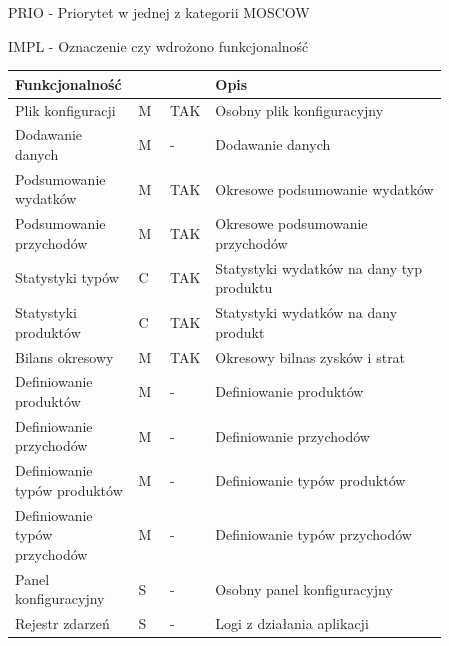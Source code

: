 \documentclass[a4paper,10pt]{report}
\newcommand{\customstyletable}[1]{\footnotesize{\textbf{#1}}}
\newcommand{\customstyletablecentered}[1]{\footnotesize\centering{\textbf{#1}}}
\begin{document}
{PRIO - Priorytet w jednej z kategorii MOSCOW \cite{MOSCOW}}

{IMPL - Oznaczenie czy wdrożono funkcjonalność}

\begin{table}[h]
    \footnotesize
    \begin{tabular}{|p{0.2\linewidth}|p{0.07\linewidth}|p{0.07\linewidth}|p{0.52\linewidth}|}  %
    \hline                  %
        
    \customstyletable{Funkcjonalność} & \customstyletablecentered{PRIO} & \customstyletablecentered{IMPL}& \customstyletable{Opis} \\
    \hline
    {Plik konfiguracji} & {M} & {TAK} & {Osobny plik konfiguracyjny}\\
    \hline
    {Dodawanie danych} & {M} & {-} & {Dodawanie danych}\\
    \hline
    {Podsumowanie wydatków} & {M} & {TAK} & {Okresowe podsumowanie wydatków}\\
    \hline
    {Podsumowanie przychodów} & {M} & {TAK} & {Okresowe podsumowanie przychodów}\\
    \hline
    {Statystyki typów} & {C} & {TAK} & {Statystyki wydatków na dany typ produktu}\\
    \hline
    {Statystyki produktów} & {C} & {TAK} & {Statystyki wydatków na dany produkt}\\
    \hline
    {Bilans okresowy} & {M} & {TAK} & {Okresowy bilnas zysków i strat}\\
    \hline
    {Definiowanie produktów} & {M} & {-} & {Definiowanie produktów}\\
    \hline
    {Definiowanie przychodów} & {M} & {-} & {Definiowanie przychodów}\\
    \hline
    {Definiowanie typów produktów} & {M} & {-} & {Definiowanie typów produktów}\\
    \hline
    {Definiowanie typów przychodów} & {M} & {-} & {Definiowanie typów przychodów}\\
    \hline
    {Panel konfiguracyjny} & {S} & {-} & {Osobny panel konfiguracyjny}\\
    \hline
    {Rejestr zdarzeń} & {S} & {-} & {Logi z działania aplikacji}\\

\end{tabular}
\end{table}
\end{document}
